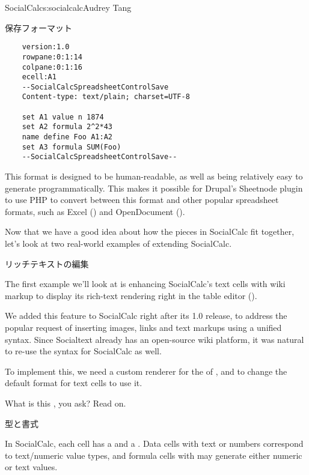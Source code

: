 \begin{aosachapter}{SocialCalc}{s:socialcalc}{Audrey Tang}
\begin{aosasect1}{保存フォーマット}
\begin{verbatim}
    version:1.0
    rowpane:0:1:14
    colpane:0:1:16
    ecell:A1
    --SocialCalcSpreadsheetControlSave
    Content-type: text/plain; charset=UTF-8

    set A1 value n 1874
    set A2 formula 2^2*43
    name define Foo A1:A2
    set A3 formula SUM(Foo)
    --SocialCalcSpreadsheetControlSave--
\end{verbatim}

\noindent This format is designed to be human-readable, as well as being
relatively easy to generate programmatically.  This makes it possible
for Drupal's Sheetnode plugin to use PHP to convert
between this format and other popular spreadsheet formats, such as
Excel () and OpenDocument ().

Now that we have a good idea about how the pieces in SocialCalc fit
together, let's look at two real-world examples of extending
SocialCalc.

\end{aosasect1}

\begin{aosasect1}{リッチテキストの編集}

The first example we'll look at is enhancing SocialCalc's text cells
with wiki markup to display its rich-text rendering right in the
table editor ().


We added this feature to SocialCalc right after its 1.0 release, to
address the popular request of inserting images, links and text
markups using a unified syntax.  Since Socialtext already has an
open-source wiki platform, it was natural to re-use the syntax for
SocialCalc as well.

To implement this, we need a custom renderer for the
 of , and to change the default
format for text cells to use it.

What is this , you ask?  Read on.

\begin{aosasect2}{型と書式}

In SocialCalc, each cell has a  and a .
Data cells with text or numbers correspond to text/numeric value
types, and formula cells with  may generate either
numeric or text values.


\end{aosasect2}
\end{aosasect1}
\end{aosachapter}
